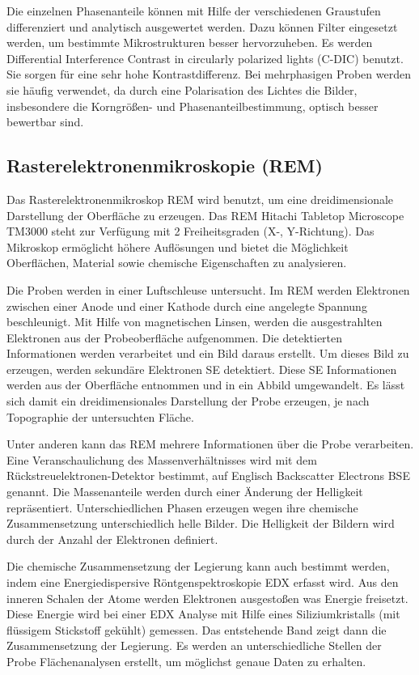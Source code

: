 Die einzelnen Phasenanteile können mit Hilfe der verschiedenen Graustufen differenziert und analytisch ausgewertet werden. Dazu können Filter eingesetzt werden, um bestimmte Mikrostrukturen besser hervorzuheben. Es werden Differential Interference Contrast in circularly polarized lights (C-DIC) benutzt. Sie sorgen für eine sehr hohe Kontrastdifferenz. Bei mehrphasigen Proben werden sie häufig verwendet, da durch eine Polarisation des Lichtes die Bilder, insbesondere die Korngrößen- und Phasenanteilbestimmung, optisch besser bewertbar sind.

\subsection*{Rasterelektronenmikroskopie (REM)}

Das Rasterelektronenmikroskop REM wird benutzt, um eine dreidimensionale Darstellung der Oberfläche zu erzeugen. Das REM Hitachi Tabletop Microscope TM3000 steht zur Verfügung mit 2 Freiheitsgraden (X-, Y-Richtung). Das Mikroskop ermöglicht höhere Auflösungen und bietet die Möglichkeit Oberflächen, Material sowie chemische Eigenschaften zu analysieren. 

Die Proben werden in einer Luftschleuse untersucht. Im REM werden Elektronen zwischen einer Anode und einer Kathode durch eine angelegte Spannung beschleunigt. Mit Hilfe von magnetischen Linsen, werden die ausgestrahlten Elektronen aus der Probeoberfläche aufgenommen. Die detektierten Informationen werden verarbeitet und ein Bild daraus erstellt. Um dieses Bild zu erzeugen, werden sekundäre Elektronen SE detektiert. Diese SE Informationen werden aus der Oberfläche entnommen und in ein Abbild umgewandelt. Es lässt sich damit ein dreidimensionales Darstellung der Probe erzeugen, je nach Topographie der untersuchten Fläche.

Unter anderen kann das REM mehrere Informationen über die Probe verarbeiten. Eine Veranschaulichung des Massenverhältnisses wird mit dem Rückstreuelektronen-Detektor bestimmt, auf Englisch Backscatter Electrons BSE genannt. Die Massenanteile werden durch einer Änderung der Helligkeit repräsentiert. Unterschiedlichen Phasen erzeugen wegen ihre chemische Zusammensetzung unterschiedlich helle Bilder. Die Helligkeit der Bildern wird durch der Anzahl der Elektronen definiert.

Die chemische Zusammensetzung der Legierung kann auch bestimmt werden, indem eine Energiedispersive Röntgenspektroskopie EDX erfasst wird. Aus den inneren Schalen der Atome werden Elektronen ausgestoßen was Energie freisetzt. Diese Energie wird bei einer EDX Analyse mit Hilfe eines Siliziumkristalls (mit flüssigem Stickstoff gekühlt) gemessen. Das entstehende Band zeigt dann die Zusammensetzung der Legierung. Es werden an unterschiedliche Stellen der Probe Flächenanalysen erstellt, um möglichst genaue Daten zu erhalten.

